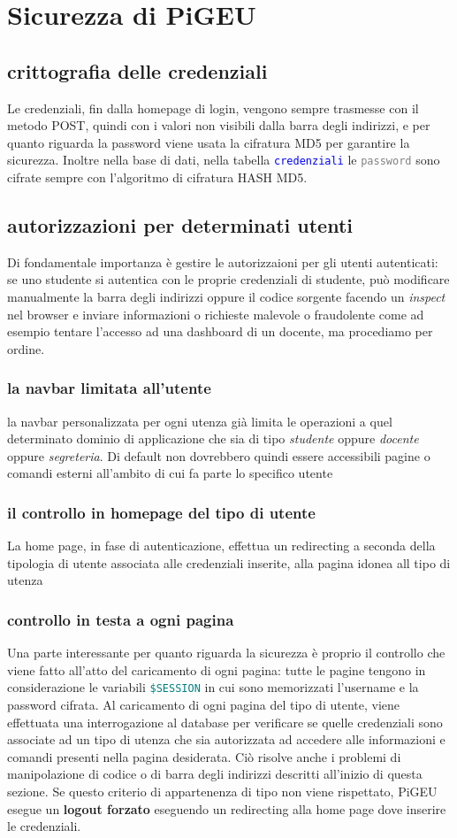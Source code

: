 \documentclass{article}
\newcommand{\tabb}[1]{\texttt{\textcolor{blue}{#1}}}
\newcommand{\attr}[1]{\texttt{\textcolor{gray}{#1}}}
\newcommand{\sqltrigger}[1]{\texttt{\textcolor{teal}{#1}}}
\newcommand{\und}[0]{\textunderscore}
\begin{document}
\section{Sicurezza di PiGEU}
\subsection{crittografia delle credenziali}
Le credenziali, fin dalla homepage di login, vengono sempre trasmesse con il metodo POST, quindi con i valori non visibili dalla barra degli indirizzi, e per quanto riguarda la password viene usata la cifratura MD5 per garantire la sicurezza.
Inoltre nella base di dati, nella tabella \tabb{credenziali} le \attr{password} sono cifrate sempre con l'algoritmo di cifratura HASH MD5.
\subsection{autorizzazioni per determinati utenti}
Di fondamentale importanza è gestire le autorizzaioni per gli utenti autenticati: se uno studente si autentica con le proprie credenziali di studente, può modificare manualmente la barra degli indirizzi oppure il codice sorgente facendo un \textit{inspect} nel browser e inviare informazioni o richieste malevole o fraudolente come ad esempio tentare l'accesso ad una dashboard di un docente, ma procediamo per ordine.
\subsubsection{la navbar limitata all'utente}
la navbar personalizzata per ogni utenza già limita le operazioni a quel determinato dominio di applicazione che sia di tipo \textit{studente} oppure \textit{docente} oppure \textit{segreteria}. Di default non dovrebbero quindi essere accessibili pagine o comandi esterni all'ambito di cui fa parte lo specifico utente
\subsubsection{il controllo in homepage del tipo di utente}
La home page, in fase di autenticazione, effettua un redirecting a seconda della tipologia di utente associata alle credenziali inserite, alla pagina idonea all tipo di utenza
\subsubsection{controllo in testa a ogni pagina}
Una parte interessante per quanto riguarda la sicurezza è proprio il controllo che viene fatto all'atto del caricamento di ogni pagina: tutte le pagine tengono in considerazione le variabili \sqltrigger{\$\und SESSION} in cui sono memorizzati l'username e la password cifrata. Al caricamento di ogni pagina del tipo di utente, viene effettuata una interrogazione al database per verificare se quelle credenziali sono associate ad un tipo di utenza che sia autorizzata ad accedere alle informazioni e comandi presenti nella pagina desiderata. Ciò risolve anche i problemi di manipolazione di codice o di barra degli indirizzi descritti all'inizio di questa sezione. Se questo criterio di appartenenza di tipo non viene rispettato, PiGEU esegue un \textbf{logout forzato} eseguendo un redirecting alla home page dove inserire le credenziali.
\end{document}
